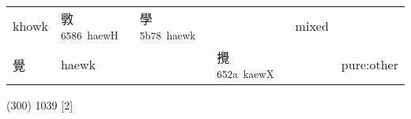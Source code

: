 \documentclass[14pt,a4paper]{scrartcl}
\begin{document}
\begin{longtable}[c]{@{}llllll@{}}
\begin{minipage}[t]{0.14\columnwidth}
khowk
\strut\end{minipage} &
\begin{minipage}[t]{0.14\columnwidth}\raggedright\strut
斆\textsuperscript{6586~haewH}
\strut\end{minipage} &
\begin{minipage}[t]{0.14\columnwidth}\raggedright\strut
學\textsuperscript{5b78~haewk}
\strut\end{minipage} &
\begin{minipage}[t]{0.14\columnwidth}\raggedright\strut
\strut\end{minipage} &
\begin{minipage}[t]{0.14\columnwidth}\raggedright\strut
mixed
\strut\end{minipage}\tabularnewline
\begin{minipage}[t]{0.14\columnwidth}\raggedright\strut
覺
\strut\end{minipage} &
\begin{minipage}[t]{0.14\columnwidth}\raggedright\strut
haewk
\strut\end{minipage} &
\begin{minipage}[t]{0.14\columnwidth}\raggedright\strut
\strut\end{minipage} &
\begin{minipage}[t]{0.14\columnwidth}\raggedright\strut
攪\textsuperscript{652a~kaewX}
\strut\end{minipage} &
\begin{minipage}[t]{0.14\columnwidth}\raggedright\strut
\strut\end{minipage} &
\begin{minipage}[t]{0.14\columnwidth}\raggedright\strut
pure:other
\strut\end{minipage}\tabularnewline
\bottomrule
\end{longtable}

(300) 1039 {[}2{]}
\end{document}
